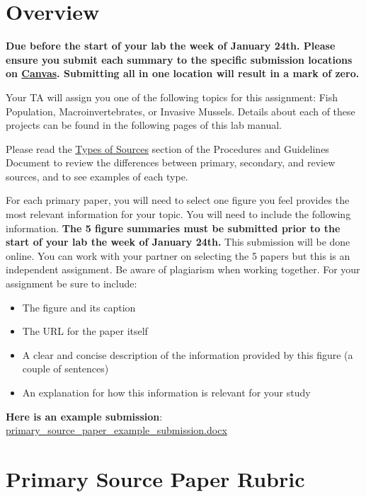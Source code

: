 \documentclass[
]{book}
\providecommand{\tightlist}{%
  \setlength{\itemsep}{0pt}\setlength{\parskip}{0pt}}
\begin{document}
\hypertarget{overview}{%
\section*{Overview}\label{overview}}

\textbf{Due before the start of your lab the week of January 24th. Please ensure you submit each summary to the specific submission locations on \href{https://canvas.ubc.ca/courses/113910}{Canvas}. Submitting all in one location will result in a mark of zero.}

Your TA will assign you one of the following topics for this assignment: Fish Population, Macroinvertebrates, or Invasive Mussels. Details about each of these projects can be found in the following pages of this lab manual.

Please read the \href{https://ubco-biology.github.io/Procedures-and-Guidelines/types-of-sources.html}{Types of Sources} section of the Procedures and Guidelines Document to review the differences between primary, secondary, and review sources, and to see examples of each type.

For each primary paper, you will need to select one figure you feel provides the most relevant information for your topic. You will need to include the following information. \textbf{The 5 figure summaries must be submitted prior to the start of your lab the week of January 24th.} This submission will be done online. You can work with your partner on selecting the 5 papers but this is an independent assignment. Be aware of plagiarism when working together. For your assignment be sure to include:

\begin{itemize}
\tightlist
\item
  The figure and its caption
\item
  The URL for the paper itself
\item
  A clear and concise description of the information provided by this figure (a couple of sentences)
\item
  An explanation for how this information is relevant for your study
\end{itemize}

\textbf{Here is an example submission}: \href{https://osf.io/download/93rpn}{primary\_source\_paper\_example\_submission.docx}

\hypertarget{primary-source-paper-rubric}{%
\section*{Primary Source Paper Rubric}\label{primary-source-paper-rubric}}
\end{document}
